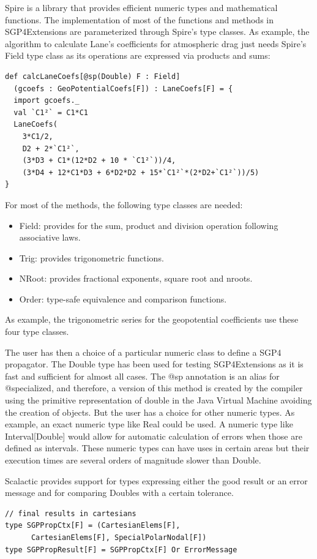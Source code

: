 \documentclass{article}
\begin{document}
Spire is a library that provides efficient numeric types and mathematical functions. The implementation of most of the functions and methods in SGP4Extensions are parameterized through Spire's type classes.
As example, the algorithm to calculate Lane's coefficients for atmospheric drag just needs Spire's Field type class
as its operations are expressed via products and sums:
\begin{verbatim}
def calcLaneCoefs[@sp(Double) F : Field]
  (gcoefs : GeoPotentialCoefs[F]) : LaneCoefs[F] = {
  import gcoefs._
  val `C1²` = C1*C1
  LaneCoefs(
    3*C1/2,
    D2 + 2*`C1²`,
    (3*D3 + C1*(12*D2 + 10 * `C1²`))/4,
    (3*D4 + 12*C1*D3 + 6*D2*D2 + 15*`C1²`*(2*D2+`C1²`))/5)
}
\end{verbatim}
For most of the methods, the following type classes are needed:
\begin{itemize}
  \item  Field: provides for the sum, product and division operation following associative laws.
  \item  Trig: provides trigonometric functions.
  \item  NRoot: provides fractional exponents, square root and nroots.
  \item  Order: type-safe equivalence and comparison functions.
\end{itemize}
As example, the trigonometric series for the geopotential coefficients use these four type classes.


The user has then a choice of a particular numeric class to define a SGP4 propagator.
The Double type has been used for testing SGP4Extensions
as it is fast and sufficient for almost all cases. The @sp annotation is an alias for
@specialized, and therefore, a version of this method is created by the compiler using the primitive representation of double in the Java Virtual Machine avoiding the creation of objects. But the user has a choice for other numeric types. As example, an exact numeric type like Real could be used. A numeric type like Interval[Double] would allow for automatic calculation of errors
when those are defined as intervals. These numeric types can have uses in certain areas
but their execution times are several orders of magnitude slower than Double.

Scalactic provides support for types expressing either the good result or an error message
and for comparing Doubles with a certain tolerance.
\begin{verbatim}
// final results in cartesians
type SGPPropCtx[F] = (CartesianElems[F],
      CartesianElems[F], SpecialPolarNodal[F])
type SGPPropResult[F] = SGPPropCtx[F] Or ErrorMessage
\end{verbatim}
\end{document}
